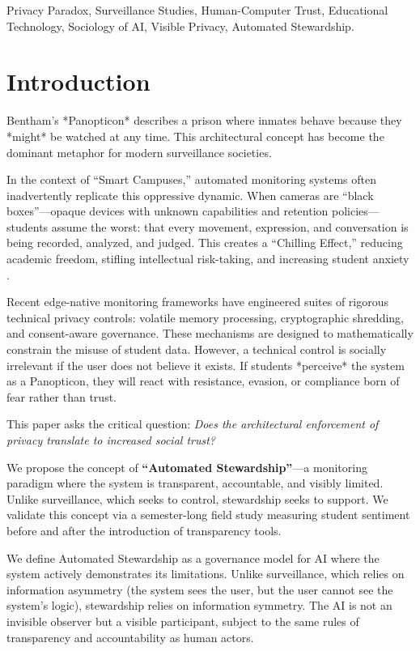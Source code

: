\documentclass[conference]{IEEEtran}
\begin{document}
\begin{IEEEkeywords}
Privacy Paradox, Surveillance Studies, Human-Computer Trust, Educational Technology, Sociology of AI, Visible Privacy, Automated Stewardship.
\end{IEEEkeywords}

\section{Introduction}
Bentham's *Panopticon* describes a prison where inmates behave because they *might* be watched at any time. This architectural concept has become the dominant metaphor for modern surveillance societies.

In the context of ``Smart Campuses,'' automated monitoring systems often inadvertently replicate this oppressive dynamic. When cameras are ``black boxes''---opaque devices with unknown capabilities and retention policies---students assume the worst: that every movement, expression, and conversation is being recorded, analyzed, and judged. This creates a ``Chilling Effect,'' reducing academic freedom, stifling intellectual risk-taking, and increasing student anxiety \cite{b7}.

Recent edge-native monitoring frameworks have engineered suites of rigorous technical privacy controls: volatile memory processing, cryptographic shredding, and consent-aware governance. These mechanisms are designed to mathematically constrain the misuse of student data. However, a technical control is socially irrelevant if the user does not believe it exists. If students *perceive* the system as a Panopticon, they will react with resistance, evasion, or compliance born of fear rather than trust.

This paper asks the critical question: \textit{Does the architectural enforcement of privacy translate to increased social trust?}

We propose the concept of \textbf{``Automated Stewardship''}---a monitoring paradigm where the system is transparent, accountable, and visibly limited. Unlike surveillance, which seeks to control, stewardship seeks to support. We validate this concept via a semester-long field study measuring student sentiment before and after the introduction of transparency tools.

We define Automated Stewardship as a governance model for AI where the system actively demonstrates its limitations. Unlike surveillance, which relies on information asymmetry (the system sees the user, but the user cannot see the system's logic), stewardship relies on information symmetry. The AI is not an invisible observer but a visible participant, subject to the same rules of transparency and accountability as human actors.
\end{document}
